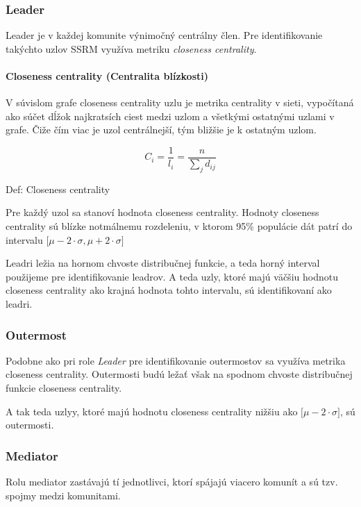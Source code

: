 \documentclass[slovak,master,public,dept460,male,cpdeclaration,oneside]{diploma}
\begin{document}
\subsubsection{Leader}

Leader je v každej komunite výnimočný centrálny člen. Pre identifikovanie takýchto uzlov SSRM využíva metriku \textit{closeness centrality}.

\paragraph{Closeness centrality (Centralita blízkosti)}
\hfill \break
V súvislom grafe closeness centrality uzlu je metrika centrality v sieti, vypočítaná ako súčet dĺžok najkratsích ciest medzi uzlom a všetkými ostatnými uzlami v grafe. Čiže čím viac je uzol centrálnejší, tým bližšie je k ostatným uzlom.


\begin{mycapequ}[!ht]
      \begin{equation*}
     C_{i} = \frac{1}{l_{i}}=\frac{n}{\sum_{j}d_{ij}}
   \end{equation*}
   \caption{Def: Closeness centrality}
\end{mycapequ}


\begin{sloppypar}
Pre každý uzol sa stanoví hodnota closeness centrality. Hodnoty closeness centrality sú blízke notmálnemu rozdeleniu, v ktorom 95\% populácie dát patrí do intervalu ${\big[ \mu - 2\cdot\sigma, \mu + 2\cdot\sigma \big]}$
\end{sloppypar}

Leadri ležia na hornom chvoste distribučnej funkcie, a teda horný interval použijeme pre identifikovanie leadrov. A teda uzly, ktoré majú väčšiu hodnotu closeness centrality ako krajná hodnota tohto intervalu, sú identifikovaní ako leadri.

\subsubsection{Outermost}
Podobne ako pri role \textit{Leader} pre identifikovanie outermostov sa využíva metrika closeness centrality. Outermosti budú ležať však na spodnom chvoste distribučnej funkcie closeness centrality.

A tak teda uzlyy, ktoré majú hodnotu closeness centrality nižšiu ako ${\big[ \mu - 2\cdot\sigma \big]}$, sú outermosti.

\subsubsection{Mediator}
Rolu mediator zastávajú tí jednotlivci, ktorí spájajú viacero komunít a sú tzv. spojmy medzi komunitami. 
\end{document}
